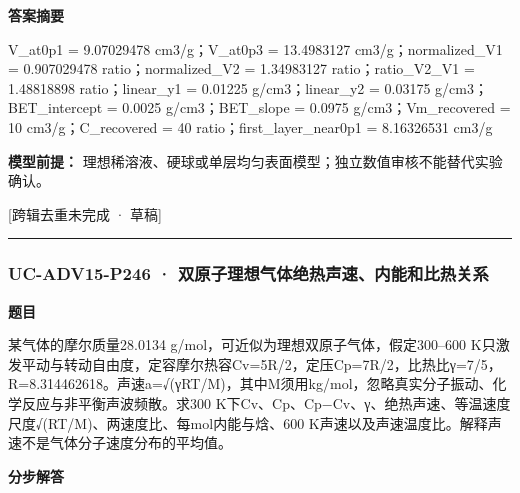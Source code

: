 \documentclass[UTF8,11pt,a4paper]{ctexart}
\begin{document}
\noindent\textbf{答案摘要}\par
V\_at0p1 = 9.07029478 cm3/g；V\_at0p3 = 13.4983127 cm3/g；normalized\_V1 = 0.907029478 ratio；normalized\_V2 = 1.34983127 ratio；ratio\_V2\_V1 = 1.48818898 ratio；linear\_y1 = 0.01225 g/cm3；linear\_y2 = 0.03175 g/cm3；BET\_intercept = 0.0025 g/cm3；BET\_slope = 0.0975 g/cm3；Vm\_recovered = 10 cm3/g；C\_recovered = 40 ratio；first\_layer\_near0p1 = 8.16326531 cm3/g\par
\noindent\textbf{模型前提：}
理想稀溶液、硬球或单层均匀表面模型；独立数值审核不能替代实验确认。\par
\noindent\textcolor{red!65!black}{[跨辑去重未完成 · 草稿]} \par
\medskip\hrule\medskip
{}
\subsubsection*{UC-ADV15-P246 · 双原子理想气体绝热声速、内能和比热关系}
\noindent\textbf{题目}\par
某气体的摩尔质量28.0134 g/mol，可近似为理想双原子气体，假定300–600 K只激发平动与转动自由度，定容摩尔热容Cv=5R/2，定压Cp=7R/2，比热比γ=7/5，R=8.314462618。声速a=√(γRT/M)，其中M须用kg/mol，忽略真实分子振动、化学反应与非平衡声波频散。求300 K下Cv、Cp、Cp−Cv、γ、绝热声速、等温速度尺度√(RT/M)、两速度比、每mol内能与焓、600 K声速以及声速温度比。解释声速不是气体分子速度分布的平均值。\par
\medskip\noindent\textbf{分步解答}
\end{document}
